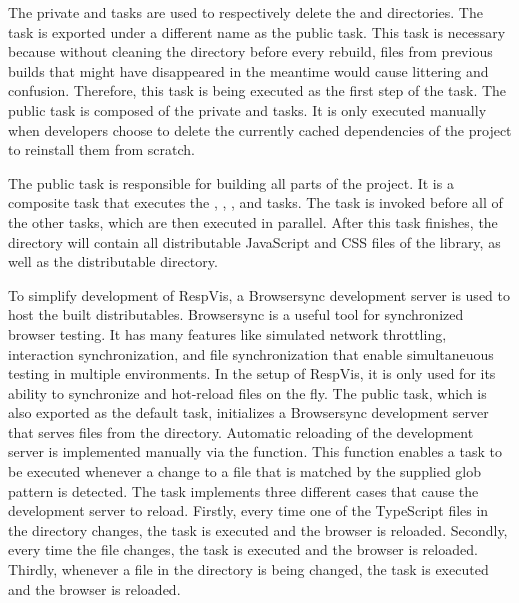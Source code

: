 The private  and  tasks are used to respectively delete the  and  directories.
The  task is exported under a different name as the public  task.
This task is necessary because without cleaning the  directory before every rebuild, files from previous builds that might have disappeared in the meantime would cause littering and confusion.
Therefore, this task is being executed as the first step of the  task.
The public  task is composed of the private  and  tasks.
It is only executed manually when developers choose to delete the currently cached dependencies of the project to reinstall them from scratch.

The public  task is responsible for building all parts of the project.
It is a composite task that executes the , , , and  tasks.
The  task is invoked before all of the other tasks, which are then executed in parallel.
After this task finishes, the  directory will contain all distributable JavaScript and CSS files of the library, as well as the distributable  directory.

To simplify development of RespVis, a Browsersync \parencite{Browsersync} development server is used to host the built distributables.
Browsersync is a useful tool for synchronized browser testing.
It has many features like simulated network throttling, interaction synchronization, and file synchronization that enable simultaneuous testing in multiple environments.
In the setup of RespVis, it is only used for its ability to synchronize and hot-reload files on the fly.
The public  task, which is also exported as the default task, initializes a Browsersync development server that serves files from the  directory.
Automatic reloading of the development server is implemented manually via the  function.
This function enables a task to be executed whenever a change to a file that is matched by the supplied glob pattern is detected.
The  task implements three different cases that cause the development server to reload.
Firstly, every time one of the TypeScript files in the  directory changes, the  task is executed and the browser is reloaded.
Secondly, every time the  file changes, the  task is executed and the browser is reloaded.
Thirdly, whenever a file in the  directory is being changed, the  task is executed and the browser is reloaded.

